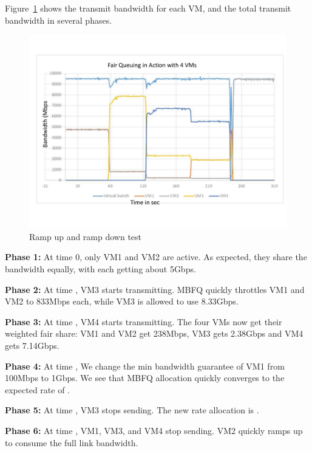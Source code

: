 Figure~\ref{fairsharing}  shows the transmit bandwidth for each VM, and the
total transmit bandwidth in several phases. 

\begin{figure}[h]
\centering
\includegraphics[width=\columnwidth,trim=60pt 20mm 0pt 8mm]{figures/fairsharing}
\caption{Ramp up and ramp down test}
\label{fairsharing}
\vspace{-3mm}
\end{figure}

{\bf Phase 1:}  At time 0, only VM1 and VM2 are active. As expected, they share
the bandwidth equally, with each getting about 5Gbps.

{\bf Phase 2:} At time , VM3 starts transmitting. MBFQ quickly
throttles VM1 and VM2 to 833Mbps each, while VM3 is allowed to use 8.33Gbps. 

{\bf  Phase 3:} At time , VM4 starts transmitting. The four VMs now
get their weighted fair share: VM1 and VM2 get 238Mbps, VM3
gets 2.38Gbps and VM4 gets 7.14Gbps. 

{\bf  Phase 4:} At time , We change the min bandwidth guarantee of VM1 from 100Mbps to
1Gbps. We see that MBFQ allocation quickly converges to the expected rate of
.

{\bf Phase 5:} At time , VM3 stops sending. The new rate allocation is
.

{\bf Phase 6:} At time , VM1, VM3, and VM4 stop sending. VM2 quickly
ramps up to consume the full link bandwidth.

